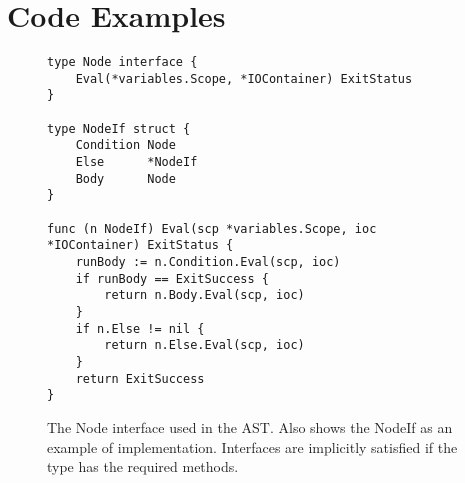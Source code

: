 \chapter{Code Examples}

\begin{figure}
\label{code:node-interface}
\begin{lstlisting}[frame=tb]
type Node interface {
	Eval(*variables.Scope, *IOContainer) ExitStatus
}

type NodeIf struct {
	Condition Node
	Else      *NodeIf
	Body      Node
}

func (n NodeIf) Eval(scp *variables.Scope, ioc *IOContainer) ExitStatus {
	runBody := n.Condition.Eval(scp, ioc)
	if runBody == ExitSuccess {
		return n.Body.Eval(scp, ioc)
	}
	if n.Else != nil {
		return n.Else.Eval(scp, ioc)
	}
	return ExitSuccess
}     
\end{lstlisting}
\caption[The Node Interface]{The Node interface used in the AST. Also shows the NodeIf as an example of implementation. Interfaces are implicitly satisfied if the type has the required methods.}
\end{figure}